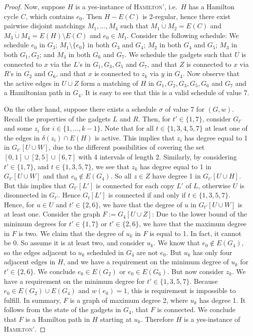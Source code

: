 \documentclass[runningheads]{llncs}
\numberwithin{equation}{section}
\newcommand{\set}[1]{\{ #1 \}}
\newcommand{\fromto}[2]{\set{#1, \ldots, #2}}
\newcommand{\dotunion}{\mathbin{\dot{\cup}}}
\begin{document}
\begin{proof}
Now, suppose $H$ is a yes-instance of \textsc{Hamilton'}, i.e.\ $H$ has a Hamilton cycle $C$, which contains $e_0$. Then $H - E(C)$ is 2-regular, hence there exist pairwise disjoint matchings $M_1, \ldots, M_4$ such that $M_1 \dotunion M_2 = E(C)$ and $M_3 \dotunion M_4 = E(H) \setminus E(C)$ and $e_0 \in M_1$. Consider the following schedule: We schedule $e_0$ in $G_3$; $M_1 \setminus \set{e_0}$ in both $G_3$ and $G_4$; $M_2$ in both $G_4$ and $G_5$; $M_3$ in both $G_1, G_2$; and $M_4$ in both $G_6$ and $G_7$. We schedule the gadgets such that $U$ is connected to $x$ via the $L$'s in $G_1, G_3, G_5$ and $G_7$, and that $Z$ is connected to $x$ via $R$'s in $G_2$ and $G_6$, and that $x$ is connected to $z_k$ via $y$ in $G_4$. Now observe that the active edges in $U \cup Z$ form a matching of $H$ in $G_1, G_2, G_3, G_5, G_6$ and $G_7$ and a Hamiltonian path in $G_4$. It is easy to see that this is a valid schedule of value 7. 

On the other hand, suppose there exists a schedule $\sigma$ of value 7 for $(G, w)$.
Recall the properties of the gadgets $L$ and $R$. Then, for $t' \in \set{1, 7}$, consider $G_{t'}$ and some $z_i$ for $i \in \fromto{1}{k-1}$. Note that for all $t \in \set{1, 3, 4, 5, 7}$ at least one of the edges in $\delta(z_i) \cap E(H)$ is active. This implies that $z_i$ has degree equal to 1 in $G_{t'}[U \cup W]$, due to the different possibilities of covering the set $[0, 1] \cup [2, 5] \cup [6, 7]$ with 4 intervals of length 2. Similarly, by considering $t' \in \set{1, 7}$, and $t \in \set{1, 3, 5, 7}$, we see that $z_k$ has degree equal to 1 in $G_{t'}[U \cup W]$ and that $e_0 \not \in E(G_{4})$. So all $z \in Z$ have degree 1 in $G_{t'}[U \cup H]$. But this implies that $G_{t'}[L']$ is connected for each copy $L'$ of $L$, otherwise $U$ is disonnected in $G_{t'}$. Hence $G_t[L']$ is connected if and only if $t \in \set{1, 3, 5, 7}$. Hence, for $u \in U$ and $t' \in \set{2, 6}$, we have that the degree of $u$ in $G_{t'}[U \cup W]$ is at least one. Consider the graph $F := G_{4}[U \cup Z]$: Due to the lower bound of the minimum degrees for $t' \in \set{1, 7}$ or $t' \in \set{2, 6}$, we have that the maximum degree in $F$ is two. We claim that the degree of $u_k$ in $F$ is equal to 1. In fact, it cannot be 0. So assume it is at least two, and consider $u_k$. We know that $e_0 \not\in E(G_4)$, so the edges adjacent to $u_k$ scheduled in $G_4$ are not $e_0$. But $u_k$ has only four adjacent edges in $H$, and we have a requirement on the minimum degree of $u_k$ for $t' \in \set{2, 6}$. We conclude $e_0 \in E(G_2)$ or $e_0 \in E(G_6)$. But now consider $z_k$. We have a requirement on the minimum degree for $t' \in \set{1, 3, 5, 7}$. Because $e_0 \in E(G_2) \cup E(G_4)$ and $w(e_0) = 1$, this is requirement is impossible to fulfill.
In summary, $F$ is a graph of maximum degree 2, where $u_k$ has degree 1. It follows from the state of the gadgets in $G_4$, that $F$ is connected. We conclude that $F$ is a Hamilton path in $H$ starting at $u_k$. Therefore $H$ is a yes-instance of \textsc{Hamilton'}.


\end{proof}
\end{document}
